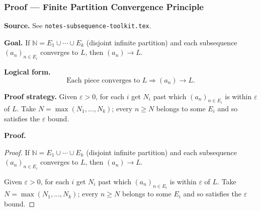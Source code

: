 
\clearpage
{}
\hypertarget{proof-RA-ABB-T-finite-partition-conv}{}

\subsubsection[Finite Partition Convergence Principle]{Proof --- Finite Partition Convergence Principle}

\bigskip

\noindent
\textbf{Source.}
See \texttt{notes-subsequence-toolkit.tex}.

\vspace{0.75em}

\noindent
\textbf{Goal.}
If $\mathbb{N} = E_1 \cup \cdots \cup E_k$ (disjoint infinite partition) and each subsequence $(a_n)_{n \in E_i}$ converges to $L$, then $(a_n) \to L$.

\vspace{0.75em}

\noindent
\textbf{Logical form.}
\[
  \text{Each piece converges to } L \Rightarrow (a_n) \to L.
\]

\vspace{0.75em}

\noindent
\textbf{Proof strategy.}
Given $\varepsilon > 0$, for each $i$ get $N_i$ past which $(a_n)_{n \in E_i}$ is within $\varepsilon$ of $L$. Take $N = \max(N_1, \ldots, N_k)$; every $n \ge N$ belongs to some $E_i$ and so satisfies the $\varepsilon$ bound.

\vspace{0.75em}

\noindent
\textbf{Proof.}
\begin{proof}
\Claim If $\mathbb{N} = E_1 \cup \cdots \cup E_k$ (disjoint infinite partition) and each subsequence $(a_n)_{n \in E_i}$ converges to $L$, then $(a_n) \to L$.

\Given 

\Goal 

\Strategy Given $\varepsilon > 0$, for each $i$ get $N_i$ past which $(a_n)_{n \in E_i}$ is within $\varepsilon$ of $L$. Take $N = \max(N_1, \ldots, N_k)$; every $n \ge N$ belongs to some $E_i$ and so satisfies the $\varepsilon$ bound.

\medskip


\end{proof}

